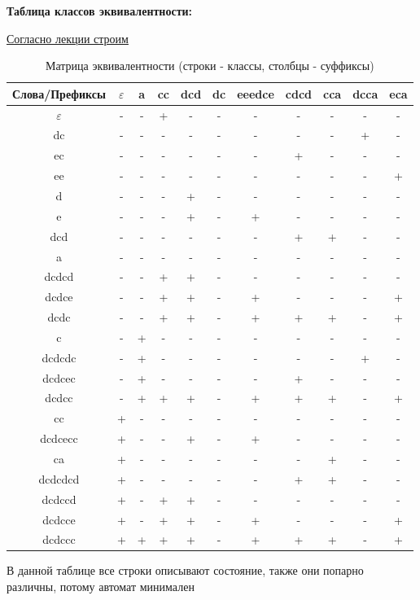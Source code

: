 \documentclass[a4paper,12pt]{article}
\begin{document}
\textbf{Таблица классов эквивалентности:}

\href{https://github.com/TonitaN/FormalLanguageTheory/blob/main/2023/lect_tfl_3.pdf}{Согласно лекции строим}
\begin{table}[H]
\centering
\caption{Матрица эквивалентности (строки - классы, столбцы - суффиксы)}
\begin{tabular}{|c|*{10}{c|}}
\hline
Слова/Префиксы & $\varepsilon$ & a & cc & dcd & dc & eeedce & cdcd & cca & dcca & eca \\
\hline
$\varepsilon$ & - & - & + & - & - & - & - & - & - & - \\
dc & - & - & - & - & - & - & - & - & + & - \\
ec & - & - & - & - & - & - & + & - & - & - \\
ee & - & - & - & - & - & - & - & - & - & + \\
d & - & - & - & + & - & - & - & - & - & - \\
e & - & - & - & + & - & + & - & - & - & - \\
dcd & - & - & - & - & - & - & + & + & - & - \\
a & - & - & - & - & - & - & - & - & - & - \\
dcdcd & - & - & + & + & - & - & - & - & - & - \\
dcdce & - & - & + & + & - & + & - & - & - & + \\
dcdc & - & - & + & + & - & + & + & + & - & + \\
c & - & + & - & - & - & - & - & - & - & - \\
dcdcdc & - & + & - & - & - & - & - & - & + & - \\
dcdcec & - & + & - & - & - & - & + & - & - & - \\
dcdcc & - & + & + & + & - & + & + & + & - & + \\
cc & + & - & - & - & - & - & - & - & - & - \\
dcdcecc & + & - & - & + & - & + & - & - & - & - \\
ca & + & - & - & - & - & - & - & + & - & - \\
dcdcdcd & + & - & - & - & - & - & + & + & - & - \\
dcdccd & + & - & + & + & - & - & - & - & - & - \\
dcdcce & + & - & + & + & - & + & - & - & - & + \\
dcdccc & + & + & + & + & - & + & + & + & - & + \\
\hline
\end{tabular}
\end{table}
В данной таблице все строки описывают состояние, также они попарно различны, потому автомат минимален
\end{document}
